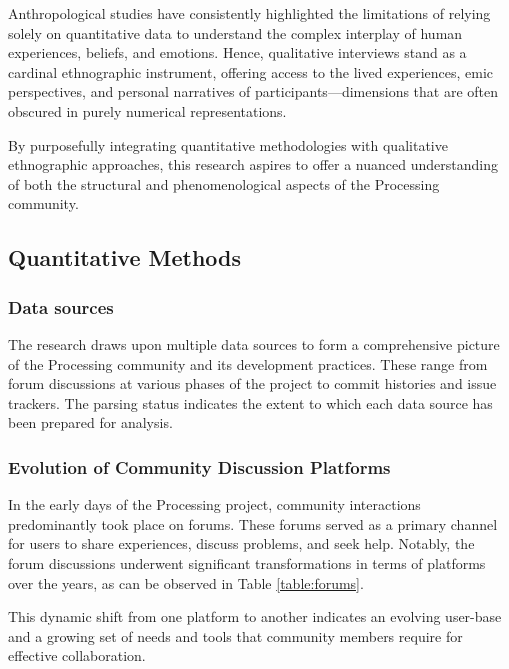 \documentclass[draft]{article}
\begin{document}
Anthropological studies have consistently highlighted the limitations of relying solely on quantitative data to understand the complex interplay of human experiences, beliefs, and emotions. Hence, qualitative interviews stand as a cardinal ethnographic instrument, offering access to the lived experiences, emic perspectives, and personal narratives of participants—dimensions that are often obscured in purely numerical representations.

By purposefully integrating quantitative methodologies with qualitative ethnographic approaches, this research aspires to offer a nuanced understanding of both the structural and phenomenological aspects of the Processing community.

\subsection{Quantitative Methods}
\subsubsection*{Data sources}

The research draws upon multiple data sources to form a comprehensive picture of the Processing community and its development practices. These range from forum discussions at various phases of the project to commit histories and issue trackers. The parsing status indicates the extent to which each data source has been prepared for analysis. 
        

\subsubsection*{Evolution of Community Discussion Platforms}
In the early days of the Processing project, community interactions predominantly took place on forums. These forums served as a primary channel for users to share experiences, discuss problems, and seek help. Notably, the forum discussions underwent significant transformations in terms of platforms over the years, as can be observed in Table \ref{table:forums}. \parencite{ProcessingForum}



This dynamic shift from one platform to another indicates an evolving user-base and a growing set of needs and tools that community members require for effective collaboration.
\end{document}
